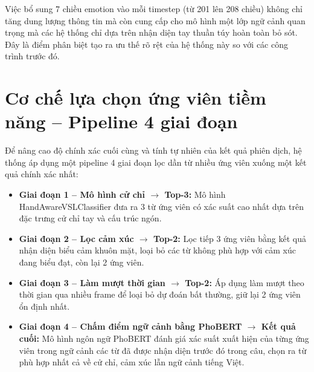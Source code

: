 Việc bổ sung 7 chiều emotion vào mỗi timestep (từ 201 lên 208 chiều)
không chỉ tăng dung lượng thông tin mà còn cung cấp cho mô hình một lớp ngữ
cảnh quan trọng mà các hệ thống chỉ dựa trên nhận diện tay thuần túy hoàn toàn
bỏ sót. Đây là điểm phân biệt tạo ra ưu thế rõ rệt của hệ thống này so với các
công trình trước đó.

\section{Cơ chế lựa chọn ứng viên tiềm năng -- Pipeline 4 giai đoạn}

Để nâng cao độ chính xác cuối cùng và tính tự nhiên của kết quả phiên dịch, hệ
thống áp dụng một pipeline 4 giai đoạn lọc dần từ nhiều ứng viên xuống một kết
quả chính xác nhất:

\begin{itemize}
    \item \textbf{Giai đoạn 1 -- Mô hình cử chỉ $\rightarrow$ Top-3:} Mô hình
    HandAwareVSLClassifier đưa ra 3 từ ứng viên có xác suất cao nhất dựa trên
    đặc trưng cử chỉ tay và cấu trúc ngón.

    \item \textbf{Giai đoạn 2 -- Lọc cảm xúc $\rightarrow$ Top-2:} Lọc tiếp 3
    ứng viên bằng kết quả nhận diện biểu cảm khuôn mặt, loại bỏ các từ không
    phù hợp với cảm xúc đang biểu đạt, còn lại 2 ứng viên.

    \item \textbf{Giai đoạn 3 -- Làm mượt thời gian $\rightarrow$ Top-2:} Áp
    dụng làm mượt theo thời gian qua nhiều frame để loại bỏ dự đoán bất thường,
    giữ lại 2 ứng viên ổn định nhất.

    \item \textbf{Giai đoạn 4 -- Chấm điểm ngữ cảnh bằng PhoBERT $\rightarrow$
    Kết quả cuối:} Mô hình ngôn ngữ PhoBERT đánh giá xác suất xuất hiện của
    từng ứng viên trong ngữ cảnh các từ đã được nhận diện trước đó trong câu,
    chọn ra từ phù hợp nhất cả về cử chỉ, cảm xúc lẫn ngữ cảnh tiếng Việt.
\end{itemize}
